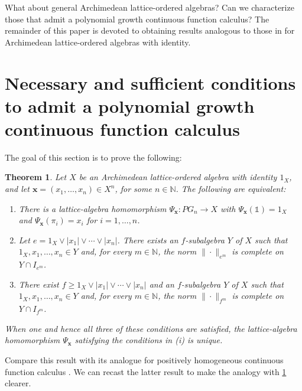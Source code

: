 \documentclass{amsart}
\theoremstyle{plain}
\newtheorem{thm}{Theorem}[section]
\theoremstyle{definition}
\theoremstyle{remark}
\newcommand\N{\ensuremath{\mathbb{N}}}
\newcommand{\one}{\mathbb{1}}
\newcommand{\Psx}{\Psi_{\bm x}}
\begin{document}
What about general Archimedean lattice-ordered algebras? Can we
characterize those that admit a polynomial growth continuous function
calculus? The
remainder of this paper is devoted to obtaining results analogous to
those in \cite{laustsen_troitsky2020} for Archimedean lattice-ordered
algebras with identity.

\section{Necessary and sufficient conditions to admit a polynomial
growth continuous function calculus}\label{sec:main}

The goal of this section is to prove the following:

\begin{thm}\label{thm:conditions}
    Let $X$ be an Archimedean lattice-ordered algebra with identity $1_X$,
    and let $\bm x = (x_1,\ldots ,x_n)\in X^{n}$, for some $n \in \N$.
    The following are equivalent:
    \begin{enumerate}
    \item There is a lattice-algebra homomorphism $\Psx\colon
        PG_n\to X$ with $\Psx(\one)=1_X$ and $\Psx(\pi _i)=x_i$
        for $i=1,\ldots ,n$.
    \item Let $e=1_X\vee |x_1|\vee \cdots \vee |x_n|$. There exists an
        $f\!$-subalgebra $Y$ of $X$ such that $1_X,x_1,\ldots ,x_n \in
        Y$ and, for every $m \in \N$, the norm $\|{\cdot }\|_{e^{m}}$
        is complete on $Y\cap I_{e^{m}}$.
    \item There exist $f\ge 1_X\vee |x_1|\vee \cdots \vee |x_n|$ and an
        $f\!$-subalgebra $Y$ of $X$ such that $1_X,x_1,\ldots ,x_n \in
        Y$ and, for every $m \in \N$, the norm $\|{\cdot }\|_{f^{m}}$
        is complete on $Y\cap I_{f^{m}}$.
    \end{enumerate}
    When one and hence all three of these conditions are satisfied,
    the lattice-algebra homomorphism $\Psx$ satisfying the conditions
    in \textit{(i)} is unique.
\end{thm}

Compare this result with its analogue for positively homogeneous
continuous function calculus \cite[Proposition
2.2]{laustsen_troitsky2020}. We can recast the latter result to make
the analogy with \cref{thm:conditions} clearer.
\end{document}
